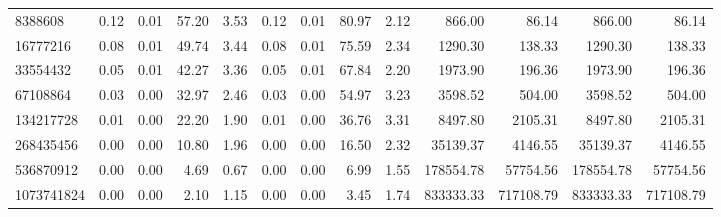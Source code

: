 \begin{tabular}{lrrrrrrrrrrrr}
8388608 & 0.12 & 0.01 & 57.20 & 3.53 & 0.12 & 0.01 & 80.97 & 2.12 & 866.00 & 86.14 & 866.00 & 86.14 \\
16777216 & 0.08 & 0.01 & 49.74 & 3.44 & 0.08 & 0.01 & 75.59 & 2.34 & 1290.30 & 138.33 & 1290.30 & 138.33 \\
33554432 & 0.05 & 0.01 & 42.27 & 3.36 & 0.05 & 0.01 & 67.84 & 2.20 & 1973.90 & 196.36 & 1973.90 & 196.36 \\
67108864 & 0.03 & 0.00 & 32.97 & 2.46 & 0.03 & 0.00 & 54.97 & 3.23 & 3598.52 & 504.00 & 3598.52 & 504.00 \\
134217728 & 0.01 & 0.00 & 22.20 & 1.90 & 0.01 & 0.00 & 36.76 & 3.31 & 8497.80 & 2105.31 & 8497.80 & 2105.31 \\
268435456 & 0.00 & 0.00 & 10.80 & 1.96 & 0.00 & 0.00 & 16.50 & 2.32 & 35139.37 & 4146.55 & 35139.37 & 4146.55 \\
536870912 & 0.00 & 0.00 & 4.69 & 0.67 & 0.00 & 0.00 & 6.99 & 1.55 & 178554.78 & 57754.56 & 178554.78 & 57754.56 \\
1073741824 & 0.00 & 0.00 & 2.10 & 1.15 & 0.00 & 0.00 & 3.45 & 1.74 & 833333.33 & 717108.79 & 833333.33 & 717108.79 \\
\bottomrule
\end{tabular}
